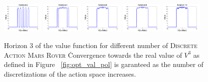 \documentclass[twoside,11pt]{article}
\newcommand{\MarsRover}{\textsc{Mars Rover }}
\begin{document}
\begin{figure}[tbp!]
\vspace{-2mm}
\centering
\includegraphics[width=0.18\textwidth]{Figures2/camdp/rover2.pdf}
\includegraphics[width=0.18\textwidth]{Figures2/camdp/rover4.pdf}
\includegraphics[width=0.18\textwidth]{Figures2/camdp/rover6.pdf}
\includegraphics[width=0.18\textwidth]{Figures2/camdp/rover8.pdf}
\includegraphics[width=0.18\textwidth]{Figures2/camdp/rover10.pdf}

\vspace{-2mm}
\caption{%
Horizon 3 of the value function for different number of \textsc{Discrete Action} \MarsRover\. Convergence towards the real value of $V^3$ as defined in Figure ~\ref{fig:opt_val_pol} is garanteed as the number of discretizations of the action space increases.
}
\label{fig:roverDisV}
\vspace{-5mm}
\end{figure}
\end{document}
